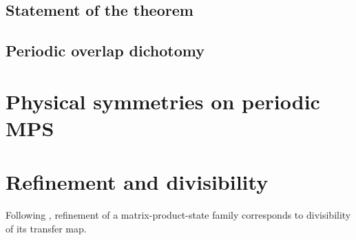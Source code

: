 
\subsection{Statement of the theorem}


\subsection{Periodic overlap dichotomy}







\section{Physical symmetries on periodic MPS}\label{sec:periodic_symmetry}


\section{Refinement and divisibility}\label{sec:periodic_refinement}

Following \cite[Theorem~4.1]{DeLasCuevas2017Irreducible}, refinement of a
matrix-product-state family corresponds to divisibility of its transfer map.


